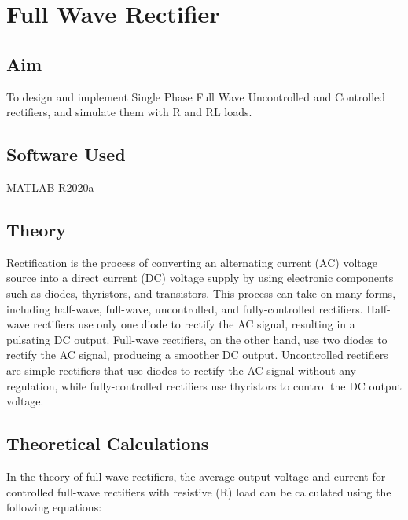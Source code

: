 \chapter{Full Wave Rectifier}
\vspace{-1cm}

\section{Aim}
\hspace{1cm}To design and implement Single Phase Full Wave Uncontrolled and Controlled rectifiers, and
simulate them with R and RL loads.

\section{Software Used}
\hspace{1cm}MATLAB R2020a
\section{Theory}
\hspace{\parindent}

Rectification is the process of converting an alternating current (AC) voltage source into a direct current (DC) voltage supply by using electronic components such as diodes, thyristors, and transistors. This process can take on many forms, including half-wave, full-wave, uncontrolled, and fully-controlled rectifiers. Half-wave rectifiers use only one diode to rectify the AC signal, resulting in a pulsating DC output. Full-wave rectifiers, on the other hand, use two diodes to rectify the AC signal, producing a smoother DC output. Uncontrolled rectifiers are simple rectifiers that use diodes to rectify the AC signal without any regulation, while fully-controlled rectifiers use thyristors to control the DC output voltage.


\section{Theoretical Calculations}
\hspace{\parindent}
In the theory of full-wave rectifiers, the average output voltage and current for controlled full-wave rectifiers with resistive (R) load can be calculated using the following equations:

